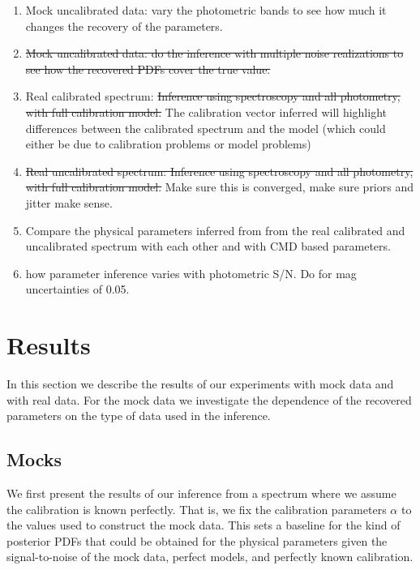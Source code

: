 \documentclass[iop,numberedappendix]{emulateapj}
\begin{document}
\begin{enumerate}
\item Mock uncalibrated data:  vary the photometric bands to see how
  much it changes the recovery of the parameters.

\item \sout{Mock uncalibrated data: do the inference with multiple noise
  realizations to see how the recovered PDFs cover the true value.}

\item Real calibrated spectrum:   \sout{Inference using spectroscopy and all
  photometry, with full calibration model.} The calibration vector
  inferred will highlight differences between the calibrated spectrum
  and the model (which could either be due to calibration problems or
  model problems)

\item \sout{Real uncalibrated spectrum:   Inference using spectroscopy and all
  photometry, with full calibration model. } Make sure this is
converged, make sure priors and jitter make sense.

\item Compare the physical parameters inferred from from the real
  calibrated and uncalibrated spectrum with each other and with CMD
  based parameters.

\item how parameter inference varies with photometric S/N.  Do for mag
  uncertainties of 0.05.

\end{enumerate}

\section{Results}

In this section we describe the results of our experiments with mock
data and with real data.  For the mock data we investigate the
dependence of the recovered parameters on the type of data used in the
inference.

\subsection{Mocks}
We first present the results of our inference from a spectrum where we
assume the calibration is known perfectly.  That is, we fix the
calibration parameters $\alpha$ to the values used to construct the
mock data.  This sets a baseline for the kind of posterior PDFs that
could be obtained for the physical parameters given the
signal-to-noise of the mock data, perfect models, and perfectly known
calibration.
\end{document}
